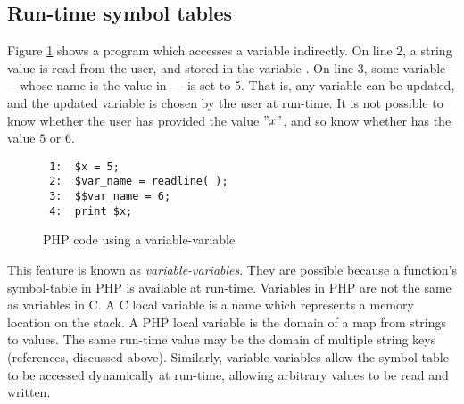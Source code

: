 \subsection{Run-time symbol tables}
\label{run-time-tables}

Figure \ref{variable-variable} shows a program which accesses a
variable indirectly.
On line 2, a string value is read from the user, and stored in the
variable .  On line 3, some variable---whose name is the
value in  --- is set to 5.  That is, any variable can be
updated, and the updated variable is chosen by the user at run-time.
It is not possible to know whether the user has provided the value
$"x"$, and so know whether  has the value $5$ or $6$.

\begin{figure}[thp]
\begin{verbatim}
 1:  $x = 5;
 2:  $var_name = readline( );
 3:  $$var_name = 6;
 4:  print $x;
\end{verbatim}
\caption{PHP code using a variable-variable}
\label{variable-variable}
\end{figure}

This feature is known as \textit{variable-variables}.  They are
possible because a function's symbol-table in PHP is available at
run-time.  Variables in PHP are not the same as variables in C.  A C
local variable is a name which represents a memory location on the
stack.  A PHP local variable is the domain of a map from strings to
values.  The same run-time value may be the domain of multiple string
keys (references, discussed above).  Similarly, variable-variables
allow the symbol-table to be accessed dynamically at run-time,
allowing arbitrary values to be read and written.

